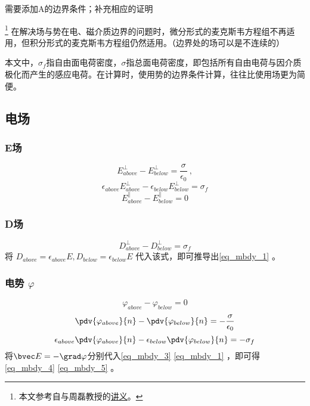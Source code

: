 
\begin{issues}
\issueTODO 需要添加A的边界条件；补充相应的证明
\end{issues}

\footnote{本文参考自\cite{GriffE}与周磊教授的\href{http://fdjpkc.fudan.edu.cn/d200927/2009/0314/c8569a14801/page.htm}{讲义}。}
在解决场与势在电、磁介质边界的问题时，微分形式的麦克斯韦方程组不再适用，但积分形式的麦克斯韦方程组仍然适用。（边界处的场可以是不连续的）

本文中，$\sigma_f$指自由面电荷密度，$\sigma$指总面电荷密度，即包括所有自由电荷与因介质极化而产生的感应电荷。在计算时，使用势的边界条件计算，往往比使用场更为简便。

\subsection{电场}

\subsubsection{E场}
\begin{equation}\label{eq_mbdy_3}
E^\perp_{above} - E^\perp_{below} = \frac{\sigma}{\epsilon_0}~,
\end{equation}
\begin{equation}\label{eq_mbdy_1}
\epsilon_{above}E^\perp_{above} - \epsilon_{below}E^\perp_{below} = \sigma_f
\end{equation}
\begin{equation}\label{eq_mbdy_7}
E^\parallel_{above} - E^\parallel_{below} = 0
\end{equation}

\subsubsection{D场}
\begin{equation}\label{eq_mbdy_6}
D^\perp_{above} - D^\perp_{below} = \sigma_f
\end{equation}
将 $D_{above}=\epsilon_{above} E, D_{below}=\epsilon_{below} E$ 代入该式，即可推导出\autoref{eq_mbdy_1} 。

\subsubsection{电势 $\varphi$}
\begin{equation}
\varphi_{above}-\varphi_{below}=0
\end{equation}
\begin{equation}\label{eq_mbdy_4}
\pdv{\varphi_{above}}{n} - \pdv{\varphi_{below}}{n}  = -\frac{\sigma}{\epsilon_0}
\end{equation}
\begin{equation}\label{eq_mbdy_5}
\epsilon_{above}\pdv{\varphi_{above}}{n} - \epsilon_{below}\pdv{\varphi_{below}}{n}  = -\sigma_f
\end{equation}
将$\bvec E= -\grad \varphi$分别代入\autoref{eq_mbdy_3} \autoref{eq_mbdy_1} ，即可得\autoref{eq_mbdy_4} \autoref{eq_mbdy_5} 。


